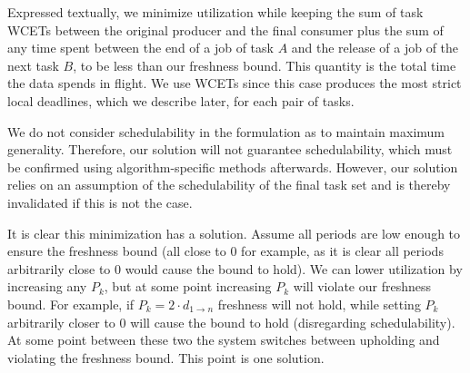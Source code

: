 Expressed textually, we minimize utilization while keeping the sum of task WCETs between the original producer and the final consumer plus the sum of any time spent between the end of a job of task $A$ and the release of a job of the next task $B$, to be less than our freshness bound. This quantity is the total time the data spends in flight. We use WCETs since this case produces the most strict local deadlines, which we describe later, for each pair of tasks.

We do not consider schedulability in the formulation as to maintain maximum generality. Therefore, our solution will not guarantee schedulability, which must be confirmed using algorithm-specific methods afterwards. However, our solution relies on an assumption of the schedulability of the final task set and is thereby invalidated if this is not the case.

It is clear this minimization has a solution. Assume all periods are low enough to ensure the freshness bound (all close to $0$ for example, as it is clear all periods arbitrarily close to $0$ would cause the bound to hold). We can lower utilization by increasing any $P_k$, but at some point increasing $P_k$ will violate our freshness bound. For example, if $P_k = 2 \cdot d_{1 \to n}$ freshness will not hold, while setting $P_k$ arbitrarily closer to $0$ will cause the bound to hold (disregarding schedulability). At some point between these two the system switches between upholding and violating the freshness bound. This point is one solution.